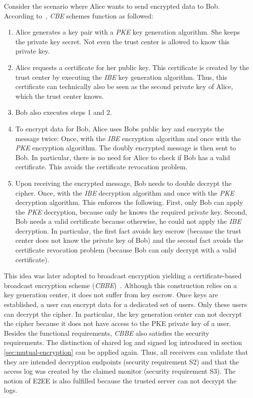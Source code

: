 \documentclass[../main.tex]{subfiles}
\begin{document}
Consider the scenario where Alice wants to send encrypted data to Bob. 
According to~\cite{Gentry2003}, \textit{CBE} schemes function as followed:

\begin{enumerate}
    \item Alice generates a key pair with a \textit{PKE} key generation algorithm. She keeps the private key secret. 
    Not even the trust center is allowed to know this private key.
    \item Alice requests a certificate for her public key. 
    This certificate is created by the trust center by executing the \textit{IBE} key generation algorithm. 
    Thus, this certificate can technically also be seen as the second private key of Alice, which the trust center knows.
    \item Bob also executes steps 1 and 2.
    \item To encrypt data for Bob, Alice uses Bobs public key and encrypts the message twice: Once, with the \textit{IBE} encryption algorithm and once with the \textit{PKE} encryption algorithm. The doubly encrypted message is then sent to Bob. In particular, there is no need for Alice to check if Bob has a valid certificate. This avoids the certificate revocation problem.
    \item Upon receiving the encrypted message, Bob needs to double decrypt the cipher. 
    Once, with the \textit{IBE} decryption algorithm and once with the \textit{PKE} decryption algorithm. 
    This enforces the following.
    First, only Bob can apply the \textit{PKE} decryption, because only he knows the required private key. 
    Second, Bob needs a valid certificate because otherwise, he could not apply the \textit{IBE} decryption. 
    In particular, the first fact avoids key escrow (because the trust center does not know the private key of Bob) and the second fact avoids the certificate revocation problem (because Bob can only decrypt with a valid certificate).
\end{enumerate}
This idea was later adopted to broadcast encryption yielding a certificate-based broadcast encryption scheme (\textit{CBBE})~\cite{Li2018}.
Although this construction relies on a key generation center, it does not suffer from key escrow.
Once keys are established, a user can encrypt data for a dedicated set of users.
Only these users can decrypt the cipher.
In particular, the key generation center can not decrypt the cipher because it does not have access to the PKE private key of a user.
Besides the functional requirements, \textit{CBBE} also satisfies the security requirements.
The distinction of shared log and signed log introduced in section \ref{sec:mutual-encryption} can be applied again.
Thus, all receivers can validate that they are intended decryption endpoints (security requirement S2) and that the access log was created by the claimed monitor (security requirement S3).
The notion of E2EE is also fulfilled because the trusted server can not decrypt the logs.
\end{document}

